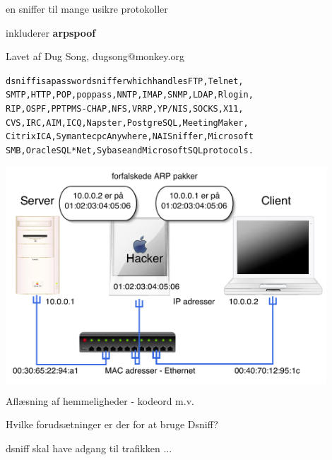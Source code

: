 
\begin{list1}
\item en sniffer til mange usikre protokoller
\item inkluderer {\bfseries arpspoof}  
\item Lavet af Dug Song, dugsong@monkey.org
\item 
\begin{alltt}
\small
dsniff  is  a  password sniffer which handles FTP, Telnet,
SMTP, HTTP, POP, poppass, NNTP, IMAP, SNMP, LDAP,  Rlogin,
RIP,  OSPF,  PPTP  MS-CHAP, NFS, VRRP, YP/NIS, SOCKS, X11,
CVS, IRC, AIM, ICQ, Napster,  PostgreSQL,  Meeting  Maker,
Citrix  ICA,  Symantec  pcAnywhere, NAI Sniffer, Microsoft
SMB, Oracle SQL*Net, Sybase and Microsoft SQL protocols.
\end{alltt}
\end{list1}


\begin{center}
  \colorbox{white}{\includegraphics[width=12cm]{images/arp-spoof.pdf}}  
\end{center}

\begin{list1}
\item Aflæsning af hemmeligheder - kodeord m.v.
\item Hvilke forudsætninger er der for at bruge Dsniff?
\item dsniff skal have adgang til trafikken ...
\end{list1}


